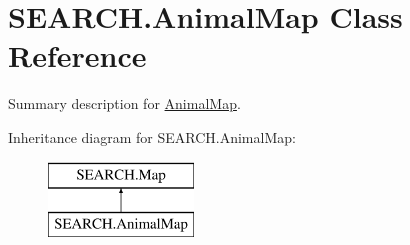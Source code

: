 \hypertarget{class_s_e_a_r_c_h_1_1_animal_map}{\section{S\-E\-A\-R\-C\-H.\-Animal\-Map Class Reference}
\label{class_s_e_a_r_c_h_1_1_animal_map}
}


Summary description for \hyperlink{class_s_e_a_r_c_h_1_1_animal_map}{Animal\-Map}.  


Inheritance diagram for S\-E\-A\-R\-C\-H.\-Animal\-Map\-:\begin{figure}[H]
\begin{center}
\leavevmode
\includegraphics[height=2.000000cm]{class_s_e_a_r_c_h_1_1_animal_map}
\end{center}
\end{figure}
